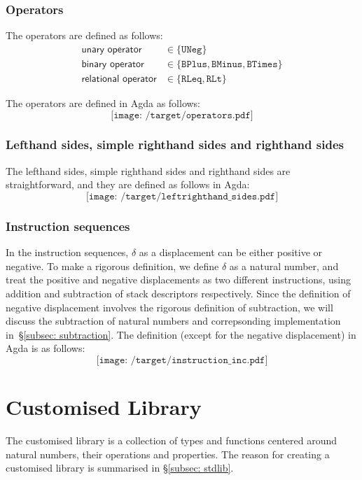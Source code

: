 \documentclass[12pt,twoside,a4paper]{report}
\theoremstyle{definition}
\theoremstyle{definition}
\theoremstyle{definition}
\theoremstyle{definition}
\newcommand{\secref}[1]{\S\ref{#1}}
\begin{document}
    \subsubsection{Operators}
    The operators are defined as follows:
    \[\begin{aligned}
        \textsf{unary operator} &\in \{\texttt{UNeg}\} \\
        \textsf{binary operator} &\in \{\texttt{BPlus}, \texttt{BMinus}, \texttt{BTimes}\} \\
        \textsf{relational operator} &\in \{\texttt{RLeq}, \texttt{RLt}\}
    \end{aligned}\]

    The operators are defined in Agda as follows:
    \[\texttt{[image: /target/operators.pdf]}\]

    \subsubsection{Lefthand sides, simple righthand sides and righthand sides}
    The lefthand sides, simple righthand sides and righthand sides are straightforward, and they are defined as follows in Agda:
    \[\texttt{[image: /target/leftrighthand\_sides.pdf]}\]

    \subsubsection{Instruction sequences}
    In the instruction sequences, $\delta$ as a displacement can be either positive or negative. To make a rigorous definition, we define $\delta$ as a natural number, and treat the positive and negative displacements as two different instructions, using addition and subtraction of stack descriptors respectively. Since the definition of negative displacement involves the rigorous definition of subtraction, we will discuss the subtraction of natural numbers and correpsonding implementation in~\secref{subsec: subtraction}. The definition (except for the negative displacement) in Agda is as follows:
    \[\texttt{[image: /target/instruction\_inc.pdf]}\]


    \section{Customised Library}
    The customised library is a collection of types and functions centered around natural numbers, their operations and properties. The reason for creating a customised library is summarised in \secref{subsec: stdlib}. 
\end{document}

